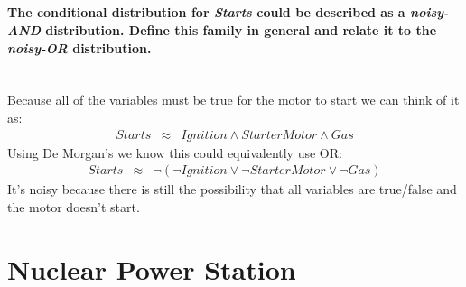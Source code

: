 \documentclass[	DIV=calc,%
				paper=a4,%
				fontsize=11pt,%
				twocolumn]{article}	 %
\begin{document}
\subsection{}
\paragraph{The conditional distribution for \emph{Starts} could be described as a \emph{noisy-AND} distribution. Define this family in general and relate it to the \emph{noisy-OR} distribution.}
~\\
Because all of the variables must be true for the motor to start we can think of it as:
\setcounter{equation}{0}
\begin{eqnarray}
Starts &\approx & Ignition \wedge StarterMotor \wedge Gas
\end{eqnarray}
Using De Morgan's we know this could equivalently use OR:
\begin{eqnarray}
Starts &\approx & \neg ( \neg Ignition \vee \neg StarterMotor \vee \neg Gas ) 
\end{eqnarray}
It's noisy because there is still the possibility that all variables are true/false and the motor doesn't start. 

\newpage
\section{Nuclear Power Station}
\end{document}

